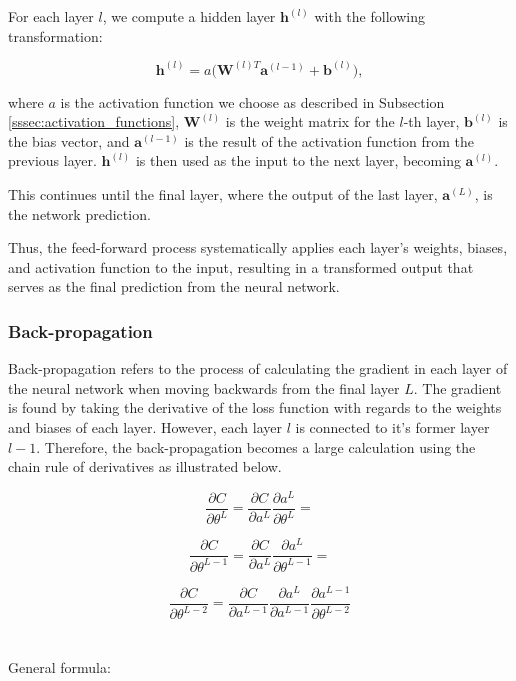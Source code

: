 For each layer \( l \), we compute a hidden layer \( \mathbf{h}^{(l)} \) with the following transformation:

\begin{equation}\label{eq:ffnn}
    \mathbf{h}^{(l)} = a \Big( \mathbf{W}^{(l)T} \mathbf{a}^{(l-1)} + \mathbf{b}^{(l)} \Big) ,
\end{equation}

where \( a \) is the activation function we choose as described in Subsection \ref{sssec:activation_functions}, 
\( \mathbf{W}^{(l)} \) is the weight matrix for the \( l \)-th layer, \( \mathbf{b}^{(l)} \) is the bias vector, 
and \( \mathbf{a}^{(l-1)} \) is the result of the activation function from the previous layer. 
\( \mathbf{h}^{(l)} \) is then used as the input to the next layer, becoming \( \mathbf{a}^{(l)} \).

This continues until the final layer, where the output of the last layer,
 \( \mathbf{a}^{(L)} \), is the network prediction. 

Thus, the feed-forward process systematically applies each layer’s weights, biases, and activation function 
to the input, resulting in a transformed output that serves as the final prediction from the neural network.

\subsubsection{Back-propagation}\label{sssec:backpropagation}

Back-propagation refers to the process of calculating the gradient in each layer of the neural network when
moving backwards from the final layer $L$. The gradient is found by taking the derivative of the 
loss function with regards to the weights and biases of each layer. However, each layer $l$ is connected to
it's former layer $l-1$. Therefore, the back-propagation becomes a large calculation using the chain rule of 
derivatives as illustrated below. 

\[
\frac{\partial C}{\partial \theta^L} = \frac{\partial C}{\partial a^L} \frac{\partial a^L}{\partial \theta^L} = 
\]

\[
\frac{\partial C}{\partial \theta^{L-1}} = \frac{\partial C}{\partial a^L} \frac{\partial a^L}{\partial \theta^{L-1}} = 
\]

\[
\frac{\partial C}{\partial \theta^{L-2}} = \frac{\partial C}{\partial a^{L-1}} \frac{\partial a^L}{\partial a^{L-1}} \frac{\partial a^{L-1}}{\partial \theta^{L-2}}
\]
\\
\\
General formula:

